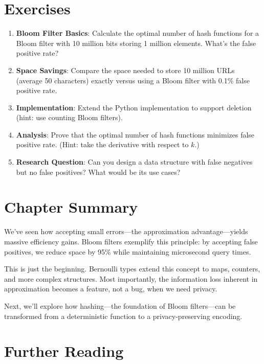 \section{Exercises}

\begin{enumerate}
    \item \textbf{Bloom Filter Basics}: Calculate the optimal number of hash functions for a Bloom filter with 10 million bits storing 1 million elements. What's the false positive rate?
    
    \item \textbf{Space Savings}: Compare the space needed to store 10 million URLs (average 50 characters) exactly versus using a Bloom filter with 0.1\% false positive rate.
    
    \item \textbf{Implementation}: Extend the Python implementation to support deletion (hint: use counting Bloom filters).
    
    \item \textbf{Analysis}: Prove that the optimal number of hash functions minimizes false positive rate. (Hint: take the derivative with respect to $k$.)
    
    \item \textbf{Research Question}: Can you design a data structure with false negatives but no false positives? What would be its use cases?
\end{enumerate}

\section{Chapter Summary}

We've seen how accepting small errors—the approximation advantage—yields massive efficiency gains. Bloom filters exemplify this principle: by accepting false positives, we reduce space by 95\% while maintaining microsecond query times.

This is just the beginning. Bernoulli types extend this concept to maps, counters, and more complex structures. Most importantly, the information loss inherent in approximation becomes a feature, not a bug, when we need privacy.

Next, we'll explore how hashing—the foundation of Bloom filters—can be transformed from a deterministic function to a privacy-preserving encoding.

\section{Further Reading}

